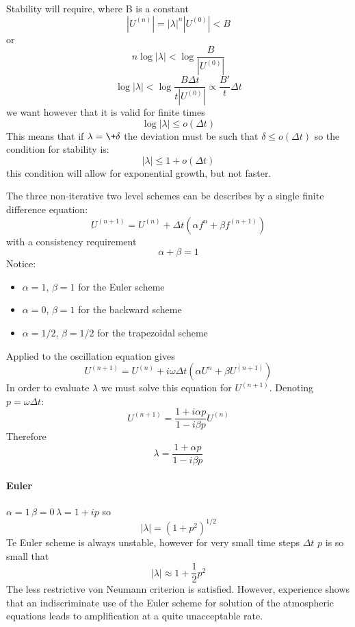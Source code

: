 Stability will require, where B is a constant
\begin{equation}
	|U^{(n)}|=|\lambda|^n|U^{(0)}|<B
\end{equation}
or
\begin{equation}
	n\log|\lambda|<\log\frac{B}{|U^{(0)}|}
\end{equation}
$$\log|\lambda|<\log\frac{B\Delta t}{t|U^{(0)}|}\propto \frac{B'}{t}\Delta t$$
we want however that it is valid for finite times
$$\log|\lambda|\leq o(\Delta t)$$
This means that if $\lambda=\+\delta$ the deviation must be such that $\delta\leq o(\Delta t)$ so the condition for stability is:
\begin{equation}
	|\lambda|\leq 1+o(\Delta t)
\end{equation}
this condition will allow for exponential growth, but not faster.

The three non-iterative two level schemes can be describes by a single finite difference equation:
\begin{equation}\label{3.2.6}
	U^{(n+1)}=U^{(n)}+\Delta t\left(\alpha f^n+\beta f^{(n+1)}\right)
\end{equation}
with a consistency requirement
$$\alpha+\beta=1$$
Notice:
\begin{itemize}
	\item $\alpha=1$, $\beta =1$ for the Euler scheme
	\item $\alpha=0$, $\beta=1$ for the backward scheme
	\item $\alpha=1/2$, $\beta=1/2$ for the trapezoidal scheme
\end{itemize}
Applied to the oscillation equation gives
\begin{equation}
	U^{(n+1)}=U^{(n)}+i\omega\Delta t\left(\alpha U^n+\beta U^{(n+1)}\right)
\end{equation}
In order to evaluate $\lambda$ we must solve this equation for $U^{(n+1)}$. Denoting $p=\omega\Delta t$:
\begin{equation}\label{3.2.9}
	U^{(n+1)}=\frac{1+i\alpha p}{1-i\beta p}U^{(n)}
\end{equation}
Therefore
\begin{equation}\label{3.2.10}
	\lambda=\frac{1+\alpha p}{1-i\beta p}
\end{equation}
\paragraph{Euler} $\alpha=1 \, \beta=0 \, \lambda=1+ip$
so $$|\lambda|=(1+p^2)^{1/2}$$
Te Euler scheme is always unstable, however for very small time steps $\Delta t$ $p$ is so small that
$$|\lambda|\approx 1+\frac{1}{2}p^2$$
The less restrictive von Neumann criterion is satisfied. However, experience shows that an indiscriminate use of the Euler scheme for solution of the atmospheric equations leads to amplification at a quite unacceptable rate.
